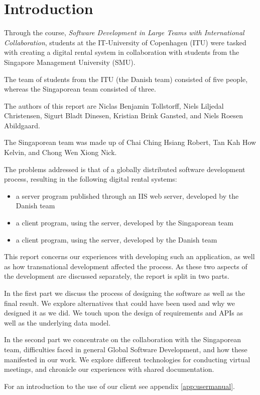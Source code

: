 \section{Introduction}
Through the course, \emph{Software Development in Large Teams with
International Collaboration}, students at the IT-University of Copenhagen (ITU)
were tasked with creating a digital rental system in collaboration with
students from the Singapore Management University (SMU).

The team of students from the ITU (the Danish team) consisted of five people,
whereas the Singaporean team consisted of three.

The authors of this report are Niclas Benjamin Tollstorff, Niels Liljedal
Christensen, Sigurt Bladt Dinesen, Kristian Brink Gansted, and Niels Roesen
Abildgaard.

The Singaporean team was made up of Chai Ching Hsiang Robert, Tan Kah How Kelvin, and
Chong Wen Xiong Nick.

The problems addressed is that of a globally distributed software development
process, resulting in the following digital rental systems:
\begin{itemize}
    \item a server program published through an IIS web server, developed by the Danish team
    \item a client program, using the server, developed by the Singaporean team
    \item a client program, using the server, developed by the Danish team
\end{itemize}

This report concerns our experiences with developing such an application, as well as how
transnational development affected the process. As these two aspects of the development
are discussed separately, the report is split in two parts.

In the first part we discuss the process of designing the software as well as
the final result. We explore alternatives that could have been used and why we
designed it as we did. We touch upon the design of requirements and APIs as
well as the underlying data model.

In the second part we concentrate on the collaboration with the Singaporean
team, difficulties faced in general Global Software Development, and how these
manifested in our work. We explore different technologies for conducting
virtual meetings, and chronicle our experiences with shared documentation.

For an introduction to the use of our client see appendix \ref{app:usermanual}.
